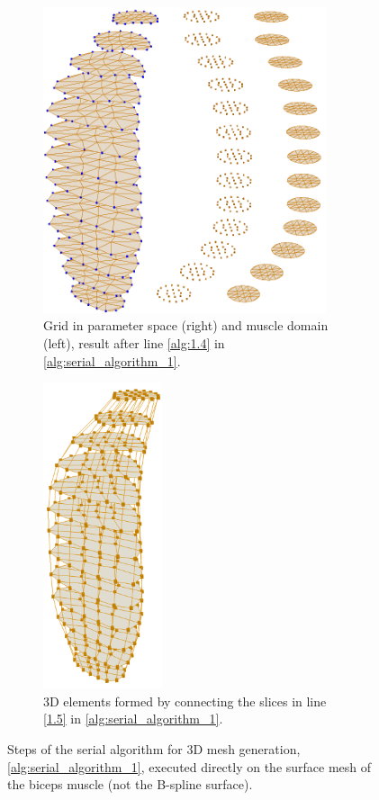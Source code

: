 \begin{figure}
\begin{subfigure}[t]{0.51\textwidth}
    \label{fig:serial_alg_3}%
  \end{subfigure}\\
  \centering%
  \begin{subfigure}[t]{0.49\textwidth}%
    \centering%
    \includegraphics[height=9cm]{images/fiber_creation/serial_alg_4_orange.png}%
    \caption{Grid in parameter space (right) and muscle domain (left), result after line \ref{alg:1.4} in \cref{alg:serial_algorithm_1}.}%
    \label{fig:serial_alg_4}%
  \end{subfigure}
  \hfill{}
  \begin{subfigure}[t]{0.4\textwidth}%
    \centering%
    \includegraphics[height=9cm]{images/fiber_creation/serial_alg_8_orange.png}%
    \caption{3D elements formed by connecting the slices in line \ref{1.5} in \cref{alg:serial_algorithm_1}.}%
    \label{fig:serial_alg_8}%
  \end{subfigure}
  \caption{Steps of the serial algorithm for 3D mesh generation, \cref{alg:serial_algorithm_1}, executed directly on the surface mesh of the biceps muscle (not the B-spline surface).}%
  \label{fig:serial_alg}%
\end{figure}%
%

